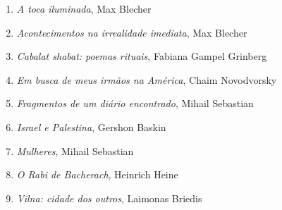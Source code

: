 





\begin{enumerate}
\setlength{\topsep}{2pt}
\setlength{\partopsep}{0pt}
\setlength\parskip{4.2pt}
\setlength\itemsep{-1.4mm}
\item \textit{A toca iluminada}, Max Blecher
\item \textit{Acontecimentos na irrealidade imediata}, Max Blecher
\item \textit{Cabalat shabat: poemas rituais}, Fabiana Gampel Grinberg
\item \textit{Em busca de meus irmãos na América}, Chaim Novodvorsky
\item \textit{Fragmentos de um diário encontrado}, Mihail Sebastian
\item \textit{Israel e Palestina}, Gershon Baskin
\item \textit{Mulheres}, Mihail Sebastian
\item \textit{O Rabi de Bacherach}, Heinrich Heine
\item \textit{Vilna: cidade dos outros}, Laimonas Briedis
\end{enumerate}






